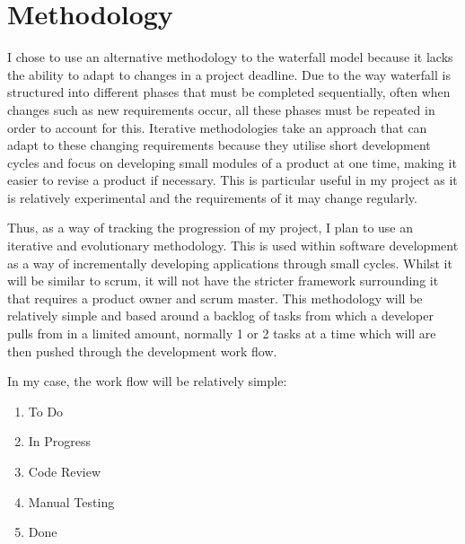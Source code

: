 \documentclass[]{report}
\begin{document}
	\section{Methodology}
	I chose to use an alternative methodology to the waterfall model because it lacks the ability to adapt to changes in a project deadline. Due to the way waterfall is structured into different phases that must be completed sequentially, often when changes such as new requirements occur, all these phases must be repeated in order to account for this. Iterative methodologies take an approach that can adapt to these changing requirements because they utilise short development cycles and focus on developing small modules of a product at one time, making it easier to revise a product if necessary. This is particular useful in my project as it is relatively experimental and the requirements of it may change regularly. 
		
	Thus, as a way of tracking the progression of my project, I plan to use an iterative and evolutionary methodology. This is used within software development as a way of incrementally developing applications through small cycles. Whilst it will be similar to scrum, it will not have the stricter framework surrounding it that requires a product owner and scrum master. This methodology will be relatively simple and based around a backlog of tasks from which a developer pulls from in a limited amount, normally 1 or 2 tasks at a time which will are then pushed through the development work flow.
		
	In my case, the work flow will be relatively simple:
	\begin{enumerate}
		\item To Do
		\item In Progress
		\item Code Review
		\item Manual Testing
		\item Done
	\end{enumerate}
		
\end{document}
